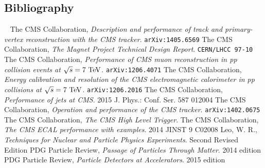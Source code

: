 \begin{appendices}
\section{Bibliography}
~
\bibspace The CMS Collaboration, \emph{Description and performance of track and primary-vertex reconstruction with the CMS tracker}. \verb|arXiv:1405.6569|
\bibspace The CMS Collaboration, \emph{The Magnet Project Technical Design Report}. \verb|CERN/LHCC 97-10|
\bibspace The CMS Collaboration, \emph{Performance of CMS muon reconstruction in pp collision events at $\sqrt{s}= 7~\text{TeV}$}. \verb|arXiv:1206.4071|
\bibspace The CMS Collaboration, \emph{Energy calibration and resolution of the CMS electromagnetic calorimeter in pp collisions at $\sqrt{s}=7~\text{TeV}$}. \verb|arXiv:1206.2016|
\bibspace The CMS Collaboration, \emph{Performance of jets at CMS}. 2015 J. Phys.: Conf. Ser. 587 012004
\bibspace The CMS Collaboration, \emph{Operation and performance of the CMS tracker}. \verb|arXiv:1402.0675|
\bibspace The CMS Collaboration, \emph{The CMS High Level Trigger}.
\bibspace The CMS Collaboration, \emph{The CMS ECAL performance with examples}. 2014 JINST 9 C02008
\bibspace Leo, W. R., \emph{Techniques for Nuclear and Particle Physics Experiments}. Second Revised Edition
\bibspace PDG Particle Review, \emph{Passage of Particles Through Matter}. 2014 edition
\bibspace PDG Particle Review, \emph{Particle Detectors at Accelerators}. 2015 edition

\end{appendices}


